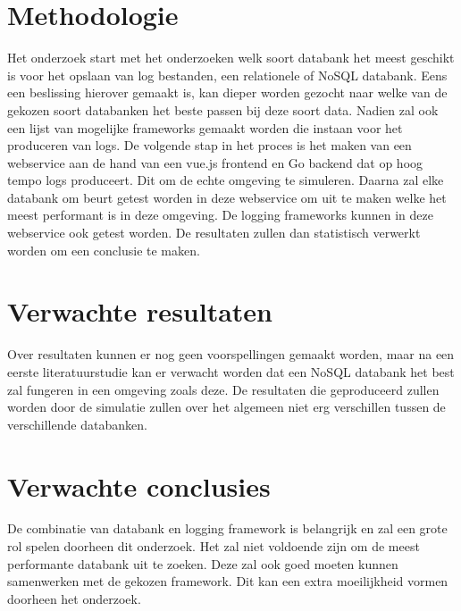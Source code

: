 \section{Methodologie}
\label{sec:methodologie}
Het onderzoek start met het onderzoeken welk soort databank het meest geschikt is voor het opslaan van log bestanden, een relationele of NoSQL databank. Eens een beslissing hierover gemaakt is, kan dieper worden gezocht naar welke van de gekozen soort databanken het beste passen bij deze soort data. Nadien zal ook een lijst van mogelijke frameworks gemaakt worden die instaan voor het produceren van logs. De volgende stap in het proces is het maken van een webservice aan de hand van een vue.js frontend en Go backend dat op hoog tempo logs produceert. Dit om de echte omgeving te simuleren. Daarna zal elke databank om beurt getest worden in deze webservice om uit te maken welke het meest performant is in deze omgeving. De logging frameworks kunnen in deze webservice ook getest worden. De resultaten zullen dan statistisch verwerkt worden om een conclusie te maken.

\section{Verwachte resultaten}
\label{sec:verwachte_resultaten}
Over resultaten kunnen er nog geen voorspellingen gemaakt worden, maar na een eerste literatuurstudie kan er verwacht worden dat een NoSQL databank het best zal fungeren in een omgeving zoals deze. De resultaten die geproduceerd zullen worden door de simulatie zullen over het algemeen niet erg verschillen tussen de verschillende databanken. 

\section{Verwachte conclusies}
\label{sec:verwachte_conclusies}
De combinatie van databank en logging framework is belangrijk en zal een grote rol spelen doorheen dit onderzoek. Het zal niet voldoende zijn om de meest performante databank uit te zoeken. Deze zal ook goed moeten kunnen samenwerken met de gekozen framework. Dit kan een extra moeilijkheid vormen doorheen het onderzoek.

